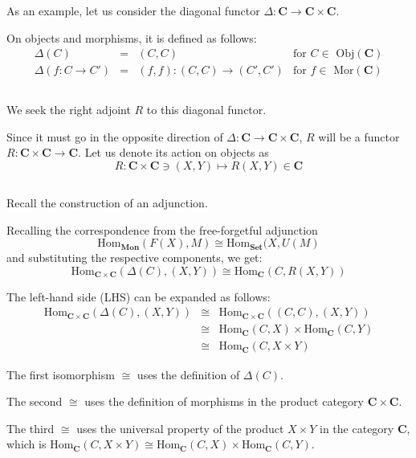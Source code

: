 \documentclass[uplatex,a4j,12pt,dvipdfmx]{jsarticle}
\begin{document}
As an example, let us consider the diagonal functor $\Delta : \mathbf{C} \to \mathbf{C} \times \mathbf{C}$.

On objects and morphisms, it is defined as follows:
\[
	\begin{array}{rclr}
		\Delta(C)          & = & (C, C)                    & \text{for $C \in$ Obj}(\mathbf{C}) \\
		\Delta(f:C \to C') & = & (f,f) : (C,C) \to (C',C') & \text{for $f \in$ Mor}(\mathbf{C})
	\end{array}
\]

${}$

We seek the right adjoint $R$ to this diagonal functor.

Since it must go in the opposite direction of $\Delta : \mathbf{C} \to \mathbf{C} \times \mathbf{C}$, $R$ will be a functor $R : \mathbf{C} \times \mathbf{C} \to \mathbf{C}$.
Let us denote its action on objects as
$$
	R : \mathbf{C} \times \mathbf{C} \ni (X,Y) \mapsto R(X,Y) \in \mathbf{C}
$$

${}$

Recall the construction of an adjunction.

Recalling the correspondence from the free-forgetful adjunction
$$
	\mathrm{Hom}_{\mathbf{Mon}}(F(X), M) \cong \mathrm{Hom}_{\mathbf{Set}}(X, U(M)
$$
and substituting the respective components, we get:
$$
	\mathrm{Hom}_{\mathbf{C} \times \mathbf{C}}(\Delta(C), (X,Y)) \cong \mathrm{Hom}_{\mathbf{C}}(C, R(X,Y))
$$

The left-hand side (LHS) can be expanded as follows:
\[
	\begin{array}{rcl}
		\mathrm{Hom}_{\mathbf{C} \times \mathbf{C}}(\Delta(C), (X,Y))
		 & \cong &
		\mathrm{Hom}_{\mathbf{C} \times \mathbf{C}}((C,C), (X,Y))
		\\ &\cong&
		\mathrm{Hom}_{\mathbf{C}}(C, X)
		\times
		\mathrm{Hom}_{\mathbf{C}}(C, Y)
		\\ &\cong&
		\mathrm{Hom}_{\mathbf{C}}(C, X \times Y)
	\end{array}
\]

The first isomorphism $\cong$ uses the definition of $\Delta(C)$.

The second $\cong$ uses the definition of morphisms in the product category $\mathbf{C} \times \mathbf{C}$.

The third $\cong$ uses the universal property of the product $X \times Y$ in the category $\mathbf{C}$,
which is $\mathrm{Hom}_{\mathbf{C}}(C, X \times Y) \cong \mathrm{Hom}_{\mathbf{C}}(C, X) \times \mathrm{Hom}_{\mathbf{C}}(C, Y)$.
\end{document}

